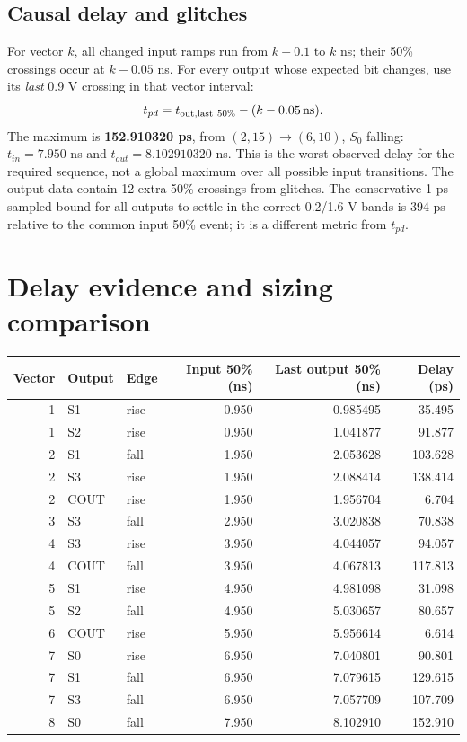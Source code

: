 \documentclass[11pt,a4paper]{article}
\begin{document}
\subsection*{Causal delay and glitches}
For vector $k$, all changed input ramps run from $k-0.1$ to $k$ ns;
their 50\% crossings occur at $k-0.05$ ns. For every output whose expected
bit changes, use its \emph{last} 0.9 V crossing in that vector interval:
\[
t_{pd}=t_{\rm out,last\ 50\%}-(k-0.05\,\mathrm{ns}).
\]
The maximum is \textbf{152.910320 ps}, from $(2,15)\rightarrow(6,10)$,
$S_0$ falling: $t_{in}=7.950$ ns and $t_{out}=8.102910320$ ns.
This is the worst observed delay for the required sequence, not a global
maximum over all possible input transitions. The output data contain 12
extra 50\% crossings from glitches. The conservative 1 ps sampled bound
for all outputs to settle in the correct 0.2/1.6 V bands is 394 ps relative
to the common input 50\% event; it is a different metric from $t_{pd}$.

\newpage
\section{Delay evidence and sizing comparison}
\begin{center}\small
\begin{tabular}{rllrrr}\toprule
Vector & Output & Edge & Input 50\% (ns) & Last output 50\% (ns) & Delay (ps)\\\midrule
1 & S1 & rise & 0.950 & 0.985495 & 35.495 \\
1 & S2 & rise & 0.950 & 1.041877 & 91.877 \\
2 & S1 & fall & 1.950 & 2.053628 & 103.628 \\
2 & S3 & rise & 1.950 & 2.088414 & 138.414 \\
2 & COUT & rise & 1.950 & 1.956704 & 6.704 \\
3 & S3 & fall & 2.950 & 3.020838 & 70.838 \\
4 & S3 & rise & 3.950 & 4.044057 & 94.057 \\
4 & COUT & fall & 3.950 & 4.067813 & 117.813 \\
5 & S1 & rise & 4.950 & 4.981098 & 31.098 \\
5 & S2 & fall & 4.950 & 5.030657 & 80.657 \\
6 & COUT & rise & 5.950 & 5.956614 & 6.614 \\
7 & S0 & rise & 6.950 & 7.040801 & 90.801 \\
7 & S1 & fall & 6.950 & 7.079615 & 129.615 \\
7 & S3 & fall & 6.950 & 7.057709 & 107.709 \\
8 & S0 & fall & 7.950 & 8.102910 & 152.910 \\
\bottomrule\end{tabular}\end{center}
\end{document}
